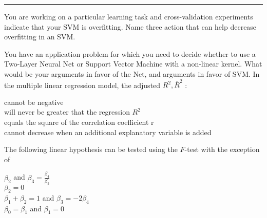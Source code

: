 \documentclass[12pt]{exam}
\begin{document}
\noindent
\rule[2ex]{\textwidth}{2pt}
\begin{questions}

\question[3] You are working on a particular learning task and cross-validation experiments indicate that your SVM is overfitting. Name three action that can help decrease overfitting in an SVM.
\makeemptybox{2in}
\addpoints

\question[4] You have an application problem for which you need to decide whether to use a Two-Layer Neural Net or Support Vector Machine with a non-linear kernel. What would be your arguments in favor of the Net, and arguments in favor of SVM.
\makeemptybox{3in}
\question[1] In the multiple linear regression model, the adjusted $R^2, \overline R^2 $ : \\
\begin{oneparchoices}
\choice cannot be negative \\
\choice will never be greater that the regression $R^2$ \\
\choice equals the square of the correlation coefficient r \\
\choice cannot decrease when an additional explanatory variable is added \\
\end{oneparchoices}
\question[2] The following linear hypothesis can be tested using the $F$-test with the exception of \\
\begin{oneparchoices}
\choice $\beta_2$ and $\beta_3 =  \frac{\beta_4}{\beta_5}$ \\
\choice $\beta_2 = 0$ \\
\choice $\beta_1 + \beta_2 =  1$ and $\beta_3 = -2 \beta_4$ \\
\choice $\beta_0 = \beta_1$ and $\beta_1 = 0$ \\
\end{oneparchoices}

\end{questions}
\end{document}

